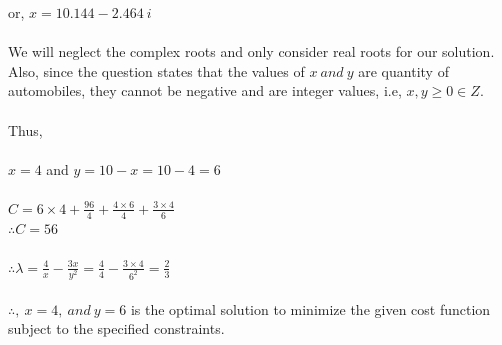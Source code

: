 or, $ x = 10.144 - 2.464\: i$\\\\
We will neglect the complex roots and only consider real roots for our solution. Also, since the question states that the values of $x \: and \: y $ are quantity of automobiles, they cannot be negative and are integer values, i.e, $x,y \geq 0 \in Z$.\\\\
Thus,\\\\
$x = 4$ and $ y = 10 - x = 10 - 4 = 6$\\\\
$C = 6 \times 4 + \frac{96}{4} + \frac{4 \times 6}{4} + \frac{3 \times 4}{6}$\\
$ \therefore C = 56$\\\\
$ \therefore \lambda = \frac{4}{x} - \frac{3x}{y^2} = \frac{4}{4} - \frac{3 \times 4}{6^2} = \frac{2}{3}$\\\\
$ \therefore, \: x = 4, \: and \: y = 6 $ is the optimal solution to minimize the given cost function subject to the specified constraints.

